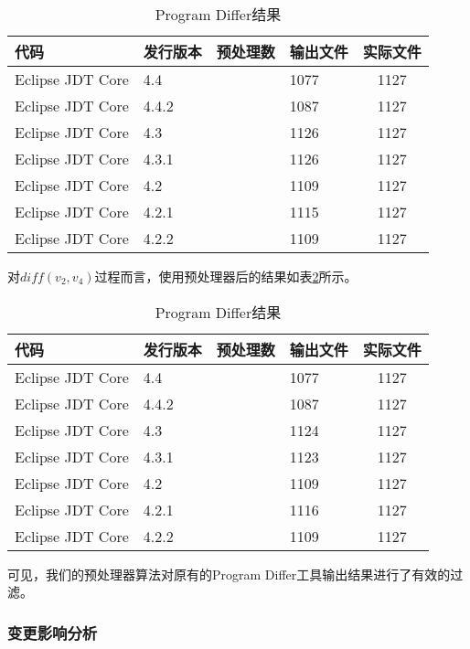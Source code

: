 \begin{table}[H]
	\caption{Program Differ结果}
	\label{data_differ_1}
	\centering
	\begin{tabular}{llllc}
		\toprule[1.5pt]
		{\heiti 代码} & {\heiti 发行版本} & {\heiti 预处理数} & {\heiti 输出文件} & {\heiti 实际文件} \\\midrule[1pt]
		Eclipse JDT Core & 4.4	& & 1077 & 1127	\\		
		Eclipse JDT Core & 4.4.2 	&  & 1087 & 1127		\\
		Eclipse JDT Core & 4.3 	& & 1126 & 1127			\\
		Eclipse JDT Core & 4.3.1 & & 1126 & 1127			\\
		Eclipse JDT Core & 4.2 		& & 1109 & 1127		\\
		Eclipse JDT Core & 4.2.1 & & 1115 & 1127			\\
		Eclipse JDT Core & 4.2.2	& & 1109 & 1127		\\
		\bottomrule[1.5pt]
	\end{tabular}
\end{table}


对$diff(v_2,v_4)$过程而言，使用预处理器后的结果如表\ref {data_differ_3}所示。

\begin{table}[H]
	\caption{Program Differ结果}
	\label{data_differ_3}
	\centering
	\begin{tabular}{llllc}
		\toprule[1.5pt]
		{\heiti 代码} & {\heiti 发行版本} & {\heiti 预处理数} &{\heiti 输出文件} & {\heiti 实际文件} \\\midrule[1pt]
		Eclipse JDT Core & 4.4	& & 1077 & 1127			\\		
		Eclipse JDT Core & 4.4.2 & & 1087 & 1127			\\
		Eclipse JDT Core & 4.3 	& & 1124 & 1127			\\
		Eclipse JDT Core & 4.3.1 	& & 1123 & 1127		\\
		Eclipse JDT Core & 4.2 		& & 1109 & 1127		\\
		Eclipse JDT Core & 4.2.1 	& & 1116 & 1127		\\
		Eclipse JDT Core & 4.2.2	& & 1109 & 1127		\\
		\bottomrule[1.5pt]
	\end{tabular}
\end{table}

可见，我们的预处理器算法对原有的Program Differ工具输出结果进行了有效的过滤。

\subsubsection{变更影响分析}

